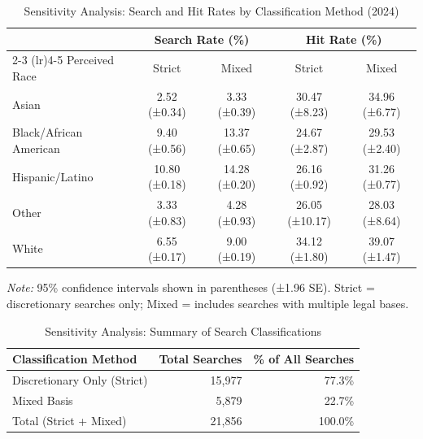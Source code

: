 \begin{table}[H]
\centering
\caption{Sensitivity Analysis: Search and Hit Rates by Classification Method (2024)}
\label{tab:sensitivity_rates}
\begin{tabular}{l cc cc}
\toprule
 & \multicolumn{2}{c}{Search Rate (\%)} & \multicolumn{2}{c}{Hit Rate (\%)} \\
\cmidrule(lr){2-3} \cmidrule(lr){4-5}
Perceived Race & Strict & Mixed & Strict & Mixed \\
\midrule
Asian & 2.52 ({\scriptsize ±0.34}) & 3.33 ({\scriptsize ±0.39}) & 30.47 ({\scriptsize ±8.23}) & 34.96 ({\scriptsize ±6.77}) \\
Black/African American & 9.40 ({\scriptsize ±0.56}) & 13.37 ({\scriptsize ±0.65}) & 24.67 ({\scriptsize ±2.87}) & 29.53 ({\scriptsize ±2.40}) \\
Hispanic/Latino & 10.80 ({\scriptsize ±0.18}) & 14.28 ({\scriptsize ±0.20}) & 26.16 ({\scriptsize ±0.92}) & 31.26 ({\scriptsize ±0.77}) \\
Other & 3.33 ({\scriptsize ±0.83}) & 4.28 ({\scriptsize ±0.93}) & 26.05 ({\scriptsize ±10.17}) & 28.03 ({\scriptsize ±8.64}) \\
White & 6.55 ({\scriptsize ±0.17}) & 9.00 ({\scriptsize ±0.19}) & 34.12 ({\scriptsize ±1.80}) & 39.07 ({\scriptsize ±1.47}) \\
\bottomrule
\end{tabular}
\smallskip
\parbox{\textwidth}{\footnotesize \textit{Note:} 95\% confidence intervals shown in parentheses (±1.96 SE). Strict = discretionary searches only; Mixed = includes searches with multiple legal bases.}
\end{table}

\begin{table}[H]
\centering
\caption{Sensitivity Analysis: Summary of Search Classifications}
\label{tab:sensitivity_summary}
\begin{tabular}{l r r}
\toprule
Classification Method & Total Searches & \% of All Searches \\
\midrule
Discretionary Only (Strict) & 15,977 & 77.3\% \\
Mixed Basis & 5,879 & 22.7\% \\
\midrule
Total (Strict + Mixed) & 21,856 & 100.0\% \\
\bottomrule
\end{tabular}
\end{table}